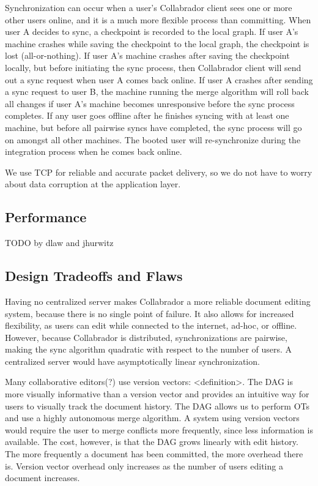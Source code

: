 \documentclass[11pt,titlepage]{article}
\begin{document}
Synchronization can occur when a user’s Collabrador client sees one or more 
other users online, and it is a much more flexible process than committing.
When user A decides to sync, a checkpoint is recorded to the local graph. 
If user A’s machine crashes while saving the checkpoint to the local graph, 
the checkpoint is lost (all-or-nothing). If user A’s machine crashes after
saving the checkpoint locally, but before initiating the sync process, then 
Collabrador client will send out a sync request when user A comes back online.
If user A crashes after sending a sync request to user B, the machine running 
the merge algorithm will roll back all changes if user A’s machine becomes
unresponsive before the sync process completes. If any user goes offline after
he finishes syncing with at least one machine, but before all pairwise syncs
have completed, the sync process will go on amongst all other machines. The 
booted user will re-synchronize during the integration process when he comes
back online.

We use TCP for reliable and accurate packet delivery, so we do not have to 
worry about data corruption at the application layer. 


\subsection{Performance}

TODO by dlaw and jhurwitz

\subsection{Design Tradeoffs and Flaws}
Having no centralized server makes Collabrador a more reliable document 
editing system, because there is no single point of failure. It also
allows for increased flexibility, as users can edit while connected 
to the internet, ad-hoc, or offline. However, because Collabrador is
distributed, synchronizations are pairwise, making the sync algorithm
quadratic with respect to the number of users. A centralized server 
would have asymptotically linear synchronization.

Many collaborative editors(?) use version vectors: <definition>. 
The DAG is more visually informative than a version vector and provides
an intuitive way for users to visually track the document history. The 
DAG allows us to perform OTs and use a highly autonomous merge algorithm.
A system using version vectors would require the user to merge conflicts 
more frequently, since less information is available. The cost, however, 
is that the DAG grows linearly with edit history. The more frequently a 
document has been committed, the more overhead there is. Version vector 
overhead only increases as the number of users editing a document increases. 
\end{document}
